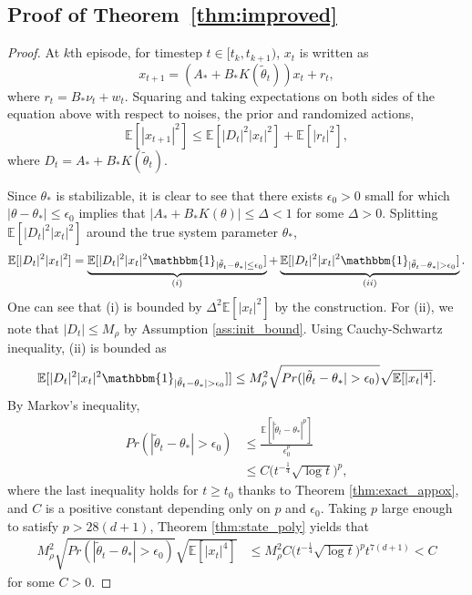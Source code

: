 \documentclass[11pt]{article}
\theoremstyle{plain}
\theoremstyle{definition}
\theoremstyle{remark}
\begin{document}
\subsection{Proof of Theorem~\ref{thm:improved}}
\label{app:thm:improved}
\begin{proof}
At $k$th episode, for timestep $t \in [t_k,t_{k+1})$, $x_{t}$ is written as
\begin{equation}\label{state_norm}
    x_{t+1} = (A_*+B_*K(\tilde{\theta}_{t}))x_{t}+ r_t,
\end{equation}
where $r_t = B_*\nu_t +w_t$.
Squaring and taking expectations on both sides of the equation above with respect to noises, the prior and randomized actions,
\begin{equation}\label{sb2}
    \mathbb{E}[|x_{t+1}|^2] \leq \mathbb{E}[|D_{t}|^{2}|x_{t}|^2]+ \mathbb{E}[|r_{t}|^2],
\end{equation}
where $D_{t} = A_*+B_*K(\tilde{\theta}_{t})$.

Since $\theta_*$ is stabilizable, it is clear to see that there exists $\epsilon_0>0$ small for which $|\theta-\theta_*|\leq \epsilon_0$ implies that $|A_*+B_* K(\theta)|\leq \Delta<1$ for some $\Delta>0$. Splitting $\mathbb{E}[|D_t|^2|x_t|^2]$ around the true system parameter $\theta_*$,
\[
\mathbb{E}[|D_{t}|^2|x_{t}|^2] = \underbrace{\mathbb{E}[|D_{t}|^2|x_{t}|^2\mathbbm{1}_{|\tilde{\theta}_{t}-\theta_*| \leq \epsilon_0}]}_{(i)} +\underbrace{\mathbb{E}[|D_{t}|^2|x_{t}|^2\mathbbm{1}_{|\tilde{\theta}_{t}-\theta_*| > \epsilon_0}]}_{(ii)}. 
\]
One can see that (i) is bounded by $\Delta^2 \mathbb{E}[|x_{t}|^2]$ by the construction. For (ii), we note that $|D_{t}| \leq M_\rho$ by Assumption \ref{ass:init_bound}. Using Cauchy-Schwartz inequality, (ii) is bounded as
\begin{equation}\label{second_1}
\mathbb{E}[|D_{t}|^2|x_{t}|^2\mathbbm{1}_{|\tilde{\theta}_{t}-\theta_*| > \epsilon_0}]] \leq M_{\rho}^2\sqrt{Pr(|\tilde{\theta}_{t}-\theta_*|>\epsilon_0)}\sqrt{\mathbb{E}[|x_{t}|^4]}.
\end{equation}
By Markov's inequality,
\begin{align*}
    Pr(|\tilde{\theta}_{t}-\theta_*|>\epsilon_0) &\leq \frac{\mathbb{E}[|\tilde{\theta}_{t}-\theta_*|^p]}{\epsilon_0^p}\\
    &\leq C\bigg(t^{-\frac{1}{4}}\sqrt{\log t}\bigg)^p,
\end{align*}
where the last inequality holds for $t\geq t_0$ thanks to Theorem \ref{thm:exact_appox}, and $C$ is a positive constant depending only on $p$ and $\epsilon_0$. 
Taking $p$ large enough to satisfy $p>28(d+1)$, Theorem \ref{thm:state_poly} yields that 
\begin{align*}
M_{\rho}^2\sqrt{Pr(|\tilde{\theta}_{t}-\theta_*|>\epsilon_0)}\sqrt{\mathbb{E}[|x_{t}|^4]}
    &\leq M_{\rho}^2C \bigg(t^{-\frac{1}{4}}\sqrt{\log t}\bigg)^pt^{7(d+1)} <C
\end{align*}
for some $C>0$.


\end{proof}
\end{document}
